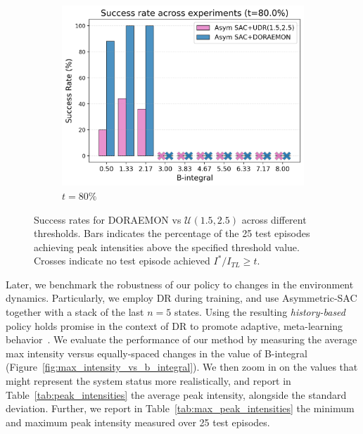 \begin{figure}
\begin{subfigure}{0.32\textwidth}
        \centering
        \includegraphics[width=\linewidth]{images/doraemon_vs_udr_succ_rate_80.png}
        \caption{\( t = 80 \% \)}
        \label{fig:succ_rate_80}
    \end{subfigure}
    \caption{Success rates for DORAEMON vs \( \mathcal U(1.5, 2.5) \) across different thresholds. Bars indicates the percentage of the 25 test episodes achieving peak intensities above the specified threshold value. Crosses indicate no test episode achieved \(I^*/I_{TL} \geq t \).}
    \label{fig:succ_rate}
\end{figure}

Later, we benchmark the robustness of our policy to changes in the environment dynamics.
Particularly, we employ DR during training, and use Asymmetric-SAC together with a stack of the last \( n=5 \) states. Using the resulting \emph{history-based} policy holds promise in the context of DR to promote adaptive, meta-learning behavior~\citep{chen2021understanding, tiboni2023domain, akkaya2019solving}.
We evaluate the performance of our method by measuring the average max intensity versus equally-spaced changes in the value of B-integral (Figure~\ref{fig:max_intensity_vs_b_integral}). We then zoom in on the values that might represent the system status more realistically, and report in Table~\ref{tab:peak_intensities} the average peak intensity, alongside the standard deviation. Further, we report in Table~\ref{tab:max_peak_intensities} the minimum and maximum peak intensity measured over 25 test episodes.

